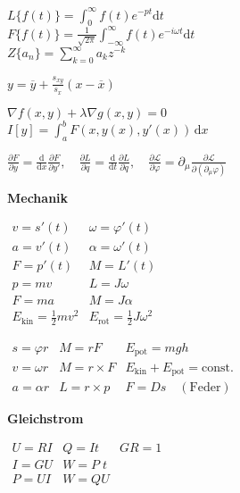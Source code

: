 \documentclass[a4paper, 10pt, fleqn, twocolumn, twoside]{article}
\newcommand{\ds}{\displaystyle}
\begin{document}
$\ds L\{f(t)\} = \int_0^{\infty} f(t)e^{-pt}\mathrm dt$\\
$\ds F\{f(t)\} = \frac{1}{\sqrt{2\pi}}\int_{-\infty}^{\infty}
f(t)e^{-i\omega t}\mathrm dt$\\
$\ds Z\{a_n\} = \sum_{k=0}^\infty a_k z^{-k}$

$\ds y = \overline y + \frac{s_{xy}}{s_x}(x-\overline x)$

$\nabla f(x,y) + \lambda\nabla g(x,y)=0$\\
$I[y]=\ds\int_a^b F(x,y(x),y'(x))\,\mathrm dx$

$\ds \frac{\partial F}{\partial y}
=\frac{\mathrm d}{\mathrm dx} \frac{\partial F}{\partial y'},\quad
\ds \frac{\partial L}{\partial q}
=\frac{\mathrm d}{\mathrm dt} \frac{\partial L}{\partial\dot q},\quad
\ds \frac{\partial\mathcal L}{\partial\varphi}
=\partial_\mu \frac{\partial\mathcal L}{\partial(\partial_\mu\varphi)}$


\newpage


\textbf{Mechanik}

${}\!\!\!\begin{array}{l|l}
v = s'(t) & \omega = \varphi'(t)\\
a = v'(t) & \alpha = \omega'(t)\\
F = p'(t) & M = L'(t)\\
p = mv & L = J\omega\\
F = ma & M = J\alpha\\
E_\mathrm{kin} = \frac{1}{2}mv^2
& E_\mathrm{rot} = \frac{1}{2}J\omega^2
\end{array}$

${}\!\!\!\begin{array}{l|l|l}
s=\varphi r& M=rF & E_\mathrm{pot} = mgh\\
v=\omega r & M=r\times F & E_\mathrm{kin}+E_\mathrm{pot} = \mathrm{const.}\\
a=\alpha r& L=r\times p & F = Ds\quad \mathrm{(Feder)}
\end{array}$



\textbf{Gleichstrom}

${}\!\!\!\begin{array}{l|l|l}
U=RI & Q=It & GR=1\\
I=GU & W=P\;\!t\\
P=UI & W=QU\\
\end{array}$
\end{document}
